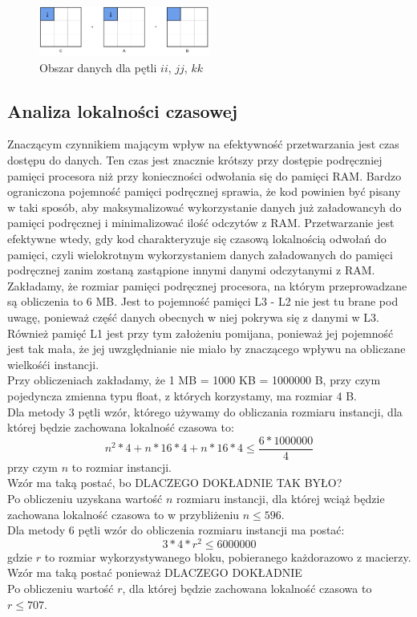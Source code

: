 \documentclass[10pt,a4paper]{article}
\begin{document}
\begin{figure}[h]
    \centering
    \includegraphics[width=0.5\textwidth]{6loops3.png}
    \caption{Obszar danych dla pętli $ii$, $jj$, $kk$}
\end{figure}

\newpage

\subsection{Analiza lokalności czasowej}
Znaczącym czynnikiem mającym wpływ na efektywność przetwarzania jest czas dostępu do
danych. Ten czas jest znacznie krótszy przy dostępie podręczniej pamięci procesora niż
przy konieczności odwołania się do pamięci RAM. Bardzo ograniczona pojemność pamięci
podręcznej sprawia, że kod powinien być pisany w taki sposób, aby maksymalizować
wykorzystanie danych już załadowancyh do pamięci podręcznej i minimalizować ilość
odczytów z RAM. Przetwarzanie jest efektywne wtedy, gdy kod charakteryzuje się
czasową lokalnością odwołań do pamięci, czyli wielokrotnym wykorzystaniem danych załadowanych
do pamięci podręcznej zanim zostaną zastąpione innymi danymi odczytanymi z RAM.\\
Zakładamy, że rozmiar pamięci podręcznej procesora, na którym przeprowadzane są
obliczenia to 6 MB. Jest to pojemność pamięci L3 - L2 nie jest tu brane pod uwagę,
ponieważ część danych obecnych w niej pokrywa się z danymi w L3. Również pamięć L1
jest przy tym założeniu pomijana, ponieważ jej pojemność jest tak mała, że jej uwzględnianie
nie miało by znaczącego wpływu na obliczane wielkośći instancji.\\
Przy obliczeniach zakładamy, że 1 MB = 1000 KB = 1000000 B, przy czym pojedyncza zmienna typu
float, z których korzystamy, ma rozmiar 4 B.
\\
Dla metody 3 pętli wzór, którego używamy do obliczania rozmiaru instancji, dla której
będzie zachowana lokalność czasowa to:
$$
    n^2 * 4 + n * 16 * 4 + n * 16 * 4 \leq \frac{6 * 1000000}{4}
$$
przy czym $n$ to rozmiar instancji.\\
Wzór ma taką postać, bo DLACZEGO DOKŁADNIE TAK BYŁO?\\
Po obliczeniu uzyskana wartość $n$ rozmiaru instancji, dla której wciąż będzie zachowana
lokalność czasowa to w przybliżeniu $n \leq 596$.\\
Dla metody 6 pętli wzór do obliczenia rozmiaru instancji ma postać:
$$
    3*4*r^2 \leq 6000000
$$
gdzie $r$ to rozmiar wykorzystywanego bloku, pobieranego każdorazowo z macierzy.\\
Wzór ma taką postać ponieważ DLACZEGO DOKŁADNIE\\
Po obliczeniu wartość $r$, dla której będzie zachowana lokalność czasowa to $r \leq 707$.
\end{document}
